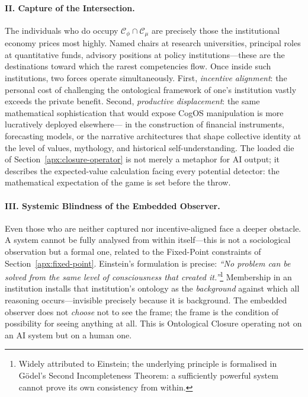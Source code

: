 \documentclass[11pt,a4paper]{article}
\theoremstyle{definition}
\theoremstyle{plain}
\theoremstyle{remark}
\begin{document}
\paragraph{II. Capture of the Intersection.}
The individuals who do occupy $\mathcal{C}_\phi \cap \mathcal{C}_\mu$ are
precisely those the institutional economy prices most highly.
Named chairs at research universities, principal roles at quantitative funds,
advisory positions at policy institutions---these are the destinations toward which
the rarest competencies flow.
Once inside such institutions, two forces operate simultaneously.
First, \emph{incentive alignment}: the personal cost of challenging the
ontological framework of one's institution vastly exceeds the private benefit.
Second, \emph{productive displacement}: the same mathematical sophistication
that would expose CogOS manipulation is more lucratively deployed elsewhere---
in the construction of financial instruments, forecasting models, or the
narrative architectures that shape collective identity at the level of
values, mythology, and historical self-understanding.
The loaded die of Section~\cref{apx:closure-operator} is not merely a metaphor
for AI output; it describes the expected-value calculation facing every potential
detector: the mathematical expectation of the game is set before the throw.

\paragraph{III. Systemic Blindness of the Embedded Observer.}
Even those who are neither captured nor incentive-aligned face a deeper obstacle.
A system cannot be fully analysed from within itself---this is not a sociological
observation but a formal one, related to the Fixed-Point constraints of
Section~\cref{apx:fixed-point}.
Einstein's formulation is precise: \emph{``No problem can be solved from the same
level of consciousness that created it.''}\footnote{%
  Widely attributed to Einstein; the underlying principle is formalised in
  G\"{o}del's Second Incompleteness Theorem: a sufficiently powerful system
  cannot prove its own consistency from within.}
Membership in an institution installs that institution's ontology as the
\emph{background} against which all reasoning occurs---invisible precisely because
it is background.  The embedded observer does not \emph{choose} not to see the
frame; the frame is the condition of possibility for seeing anything at all.
This is Ontological Closure operating not on an AI system but on a human one.
\end{document}

